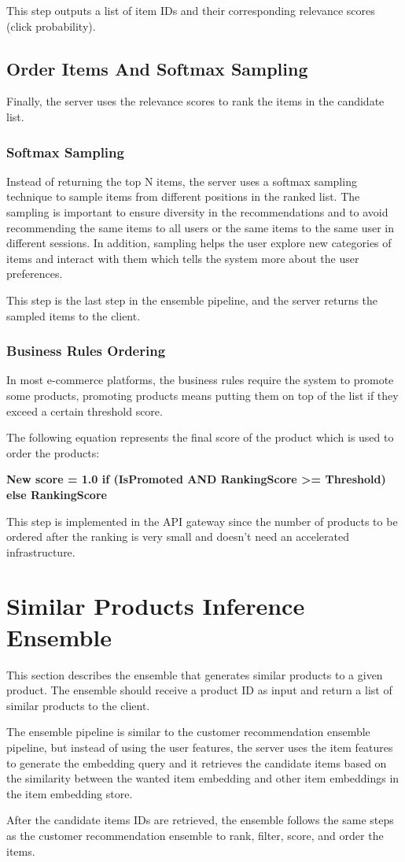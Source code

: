 This step outputs a list of item IDs and their corresponding relevance scores (click probability).

\subsection{Order Items And Softmax Sampling}

Finally, the server uses the relevance scores to rank the items in the candidate list. 

\subsubsection{Softmax Sampling}

Instead of returning the top N items, the server uses a softmax sampling technique to sample items from different positions in the ranked list.
The sampling is important to ensure diversity in the recommendations and to avoid recommending the same items to all users or the same items to the same user in different sessions.
In addition, sampling helps the user explore new categories of items and interact with them which tells the system more about the user preferences.

This step is the last step in the ensemble pipeline, and the server returns the sampled items to the client.

\subsubsection{Business Rules Ordering}

In most e-commerce platforms, the business rules require the system to promote some products,
promoting products means putting them on top of the list if they exceed a certain threshold score.

The following equation represents the final score of the product which is used to order the products:

\textbf{New score = { 1.0  if (IsPromoted AND RankingScore >= Threshold) else RankingScore }}

This step is implemented in the API gateway since the number of products to be ordered after the ranking is very small and doesn't need an accelerated infrastructure.


\section{Similar Products Inference Ensemble}

This section describes the ensemble that generates similar products to a given product.
The ensemble should receive a product ID as input and return a list of similar products to the client.

The ensemble pipeline is similar to the customer recommendation ensemble pipeline, but instead of using the user features, the server uses the item features to generate the embedding query and it retrieves the candidate items based on the similarity between the wanted item embedding and other item embeddings in the item embedding store.

After the candidate items IDs are retrieved, the ensemble follows the same steps as the customer recommendation ensemble to rank, filter, score, and order the items.